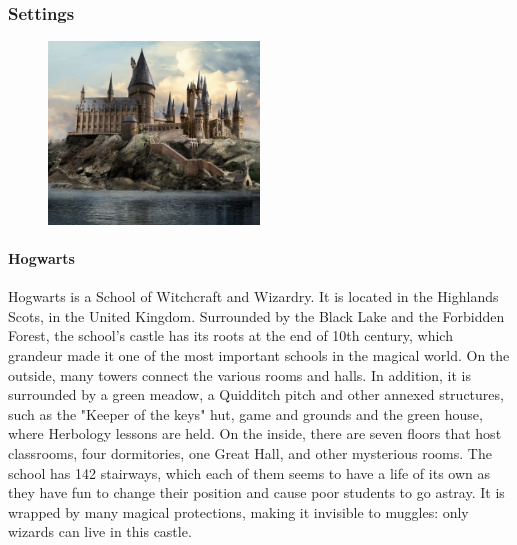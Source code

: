 \pagebreak

\subsubsection{Settings}

\begin{figure}
\centering
\includegraphics[max width=0.5\textwidth]{../Pictures/Locations/Hogwarts/Castle_picture.png}
\end{figure}
\paragraph{Hogwarts}
Hogwarts is a School of Witchcraft and Wizardry. It is located in the Highlands Scots, in the United Kingdom. Surrounded by the Black Lake and the Forbidden Forest, the school's castle has its roots at the end of 10th century, which grandeur made it one of the most important schools in the magical world. On the outside, many towers connect the various rooms and halls. In addition, it is surrounded by a green meadow, a Quidditch pitch and other annexed structures, such as the "Keeper of the keys" hut, game and grounds and the green house, where Herbology lessons are held. On the inside, there are seven floors that host classrooms, four dormitories, one Great Hall, and other mysterious rooms. The school has 142 stairways, which each of them seems to have a life of its own as they have fun to change their position and cause poor students to go astray. It is wrapped by many magical protections, making it invisible to muggles: only wizards can live in this castle. 

